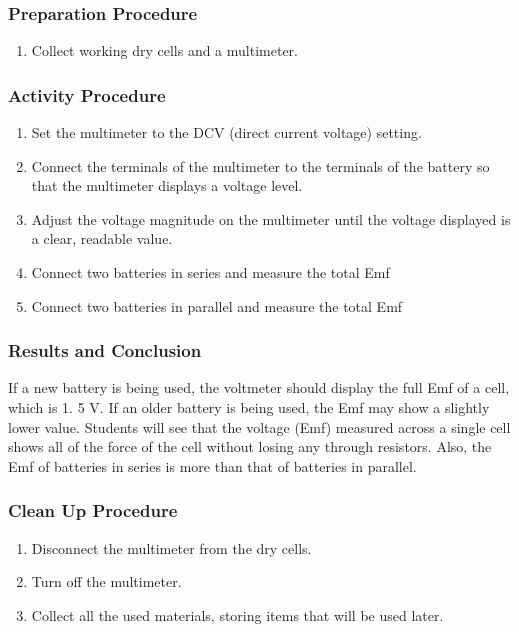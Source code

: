 \subsubsection*{Preparation Procedure}
\begin{enumerate}
\item{Collect working dry cells and a multimeter.} 
\end{enumerate}

\subsubsection*{Activity Procedure}
\begin{enumerate}
\item{Set the multimeter to the DCV (direct current voltage) setting.} 
\item{Connect the terminals of the multimeter to the terminals of the battery so that the multimeter displays a voltage level.} 
\item{Adjust the voltage magnitude on the multimeter until the voltage displayed is a clear, readable value.} 
\item{Connect two batteries in series and measure the total Emf}
\item{Connect two batteries in parallel and measure the total Emf}
\end{enumerate}

\subsubsection*{Results and Conclusion}
If a new battery is being used, the voltmeter should display the full Emf of a cell, which is 1.  5 V. If an older battery is being used, the Emf may show a slightly lower value. Students will see that the voltage (Emf) measured across a single cell shows all of the force of the cell without losing any through resistors.  Also, the Emf of batteries in series is more than that of batteries in parallel.

\subsubsection*{Clean Up Procedure}
\begin{enumerate}
\item{Disconnect the multimeter from the dry cells.} 
\item{Turn off the multimeter.} 
\item{Collect all the used materials, storing items that will be used later.} 
\end{enumerate}

